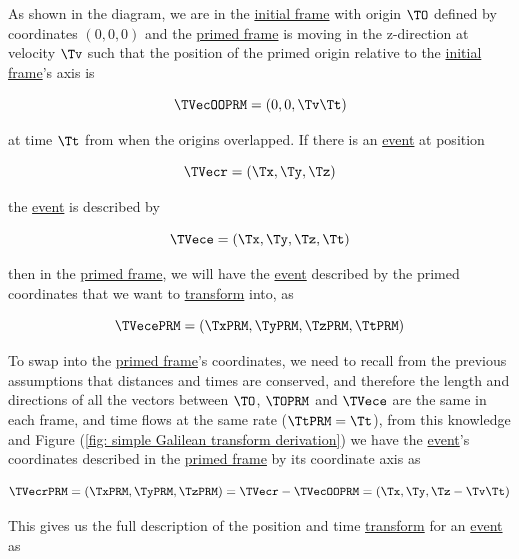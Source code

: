 As shown in the diagram, we are in the \hyperlink{def-initial-Frame}{initial frame} with origin ${\TO }$ defined by coordinates $(0,0,0)$ and the \hyperlink{def-Primed-Frame}{primed frame} is moving in the z-direction at velocity ${\Tv }$ such that the position of the primed origin relative to the \hyperlink{def-initial-Frame}{initial frame}'s axis is

\begin{equation}
	\TVecOOPRM  = (0,0,{\Tv }{\Tt })
\end{equation}

at time ${\Tt }$ from when the origins overlapped.
If there is an \hyperlink{def-event}{event} at position

\begin{equation}
	\TVecr  = ({\Tx },{\Ty },{\Tz })
\end{equation}

the \hyperlink{def-event}{event} is described by

\begin{equation}
	\TVece  = ({\Tx },{\Ty },{\Tz },{\Tt })
\end{equation}

then in the \hyperlink{def-Primed-Frame}{primed frame}, we will have the \hyperlink{def-event}{event} described by the primed coordinates that we want to \hyperlink{def-transform}{transform} into, as

\begin{equation}
	\TVecePRM  = ({\TxPRM  },{\TyPRM  },{\TzPRM  },\TtPRM )
\end{equation}

To swap into the \hyperlink{def-Primed-Frame}{primed frame}'s coordinates, we need to recall from the previous assumptions that distances and times are conserved, and therefore the length and directions of all the vectors between ${\TO }$, ${\TOPRM }$ and ${\TVece}$ are the same in each frame, and time flows at the same rate ($\TtPRM  = \Tt $), from this knowledge and Figure (\ref{fig: simple Galilean transform derivation}) we have the \hyperlink{def-event}{event}'s coordinates described in the \hyperlink{def-Primed-Frame}{primed frame} by its coordinate axis as

\begin{equation}
	{\TVecrPRM  } = ({\TxPRM  },{\TyPRM  },{\TzPRM  }) = \TVecr -\TVecOOPRM  = ({\Tx },{\Ty },{\Tz }-{\Tv }{\Tt })
	\label{eq: classical event}
\end{equation}

This gives us the full description of the position and time \hyperlink{def-transform}{transform} for an \hyperlink{def-event}{event} as

